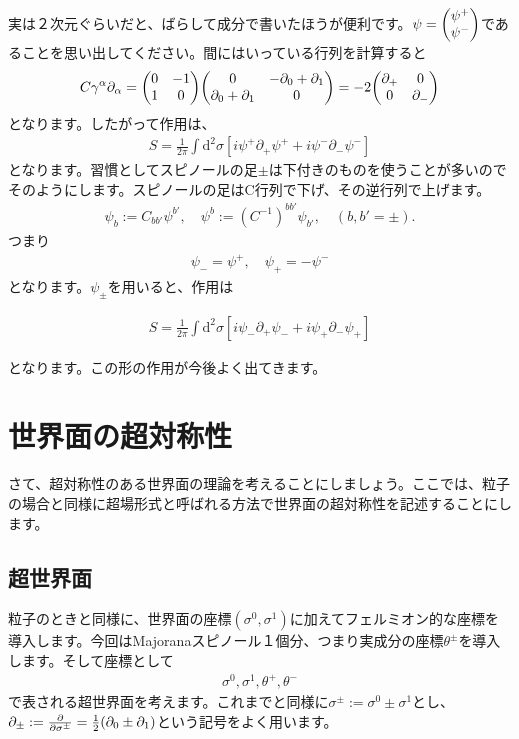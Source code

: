 \documentclass[report,paper=a4, fontsize=12pt, line_length=16cm, number_of_lines=33,dvipdfmx]{jlreq}
\newenvironment{important}{\begin{tcolorbox}[
  colback = white,
  colframe = red!35,
  boxrule = 2mm,
  fonttitle = \bfseries,
  after = \noindent] }{\end{tcolorbox}}
\numberwithin{equation}{chapter}
\numberwithin{equation}{section}
\newcommand{\del}{\partial}
\newcommand{\di}{\mathrm{d}}
\begin{document}
実は２次元ぐらいだと、ばらして成分で書いたほうが便利です。$\psi=\mqty(\psi^{+}\\ \psi^{-})$であることを思い出してください。間にはいっている行列を計算すると
\begin{align}
  C\gamma^{\alpha}\del_{\alpha}
  =\mqty(0 & -1 \\
         1 & 0 )
  \mqty(
    0 & -\del_{0}+\del_{1}\\
    \del_{0}+\del_{1}&0
  )
  =-2\mqty(
    \del_{+} & 0\\
    0 & \del_{-}
  )
\end{align}
となります。したがって作用は、
\begin{align}
  S=\frac{1}{2\pi}\int \di^2\sigma \left[ 
    i\psi^{+}\del_{+}\psi^{+}+i\psi^{-}\del_{-}\psi^{-}
   \right]
\end{align}
となります。習慣としてスピノールの足$\pm$は下付きのものを使うことが多いのでそのようにします。スピノールの足はC行列で下げ、その逆行列で上げます。
\begin{align}
  \psi_{b}:=C_{bb'}\psi^{b'},\quad \psi^{b}:=(C^{-1})^{bb'}\psi_{b'},\quad (b,b'=\pm).
\end{align}
つまり
\begin{align}
  \psi_{-}=\psi^{+},\quad \psi_{+}=-\psi^{-}
\end{align}
となります。$\psi_{\pm}$を用いると、作用は
\begin{important}
  \begin{align}
    S=\frac{1}{2\pi}\int \di^2\sigma \left[ 
      i\psi_{-}\del_{+}\psi_{-}+i\psi_{+}\del_{-}\psi_{+}
     \right]\label{free-fermion-action}
  \end{align}    
\end{important}
となります。この形の作用が今後よく出てきます。

\section{世界面の超対称性}
さて、超対称性のある世界面の理論を考えることにしましょう。ここでは、粒子の場合と同様に超場形式と呼ばれる方法で世界面の超対称性を記述することにします。

\subsection{超世界面}
粒子のときと同様に、世界面の座標$(\sigma^0,\sigma^1)$に加えてフェルミオン的な座標を導入します。今回はMajoranaスピノール１個分、つまり実成分の座標$\theta^{\pm}$を導入します。そして座標として
\begin{align}
  \sigma^{0},\sigma^{1},\theta^{+},\theta^{-}
\end{align}
で表される超世界面を考えます。これまでと同様に$\sigma^{\pm}:=\sigma^0\pm\sigma^1$とし、$\del_{\pm}:=\pdv{\sigma^{\pm}}=\frac{1}{2}(\del_{0}\pm\del_{1})$という記号をよく用います。
\end{document}

